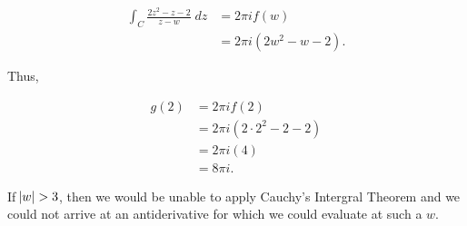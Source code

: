 \documentclass[12pt]{article}
\theoremstyle{definition}
\theoremstyle{remark}
\begin{document}
\begin{enumerate}[leftmargin=*]
        \begin{equation*}
            \begin{split}
                \int_{C}\frac{2z^2-z-2}{z-w}\;dz &= 2\pi if(w) \\
                &= 2\pi i(2w^2-w-2).
            \end{split}
        \end{equation*}
        
        \noindent Thus,
        
        \begin{equation*}
            \begin{split}
                g(2) &= 2\pi if(2) \\
                &= 2\pi i(2\cdot 2^2-2-2) \\
                &=2\pi i(4) \\
                &= 8\pi i.
            \end{split}
        \end{equation*}
        
        \noindent If $\abs{w}>3$, then we would be unable to apply Cauchy's Intergral Theorem and we could not arrive at an antiderivative for which we could evaluate at such a $w$.
    
    
    \end{enumerate}
\end{document}
